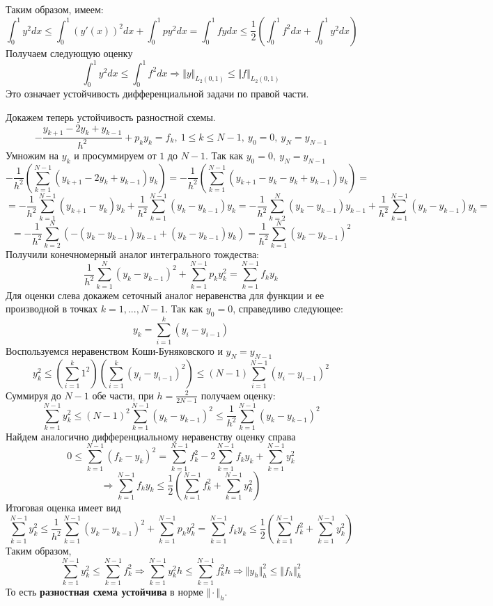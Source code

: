 Таким образом, имеем:
\[\int_0^1y^2dx\leq\int_0^1 (y'(x))^2dx+ \int_0^1py^2 dx = \int_0^1fydx\leq\frac{1}{2}\left(\int_0^1f^2dx + \int_0^1y^2dx\right)\]
Получаем следующую оценку
\[\int_0^1y^2dx\leq\int_0^1f^2dx\Rightarrow\Vert y\Vert_{L_2(0,1)}\leq\Vert f\Vert_{L_2(0,1)}\]
Это означает устойчивость дифференциальной задачи по правой части.

Докажем теперь устойчивость разностной схемы.
\[-\frac{y_{k+1}-2y_k+y_{k-1}}{h^2}+p_ky_k = f_k,\ 1 \leq k \leq N-1,\ y_0 = 0,\ y_N = y_{N-1}\]
Умножим на $y_k$ и просуммируем от $1$ до $N-1$. Так как $y_0 = 0,\ y_N = y_{N-1}$
\[-\frac{1}{h^2}\left(\sum_{k=1}^{N-1}\left(y_{k+1}-2y_k+y_{k-1}\right)y_k\right)=-\frac{1}{h^2}\left(\sum_{k=1}^{N-1}\left(y_{k+1}-y_k-y_k+y_{k-1}\right)y_k\right)=\]
\[=-\frac{1}{h^2}\sum_{k=1}^{N-1}\left(y_{k+1}-y_k\right)y_k+\frac{1}{h^2}\sum_{k=1}^{N-1}\left(y_k-y_{k-1}\right)y_k=-\frac{1}{h^2}\sum_{k=2}^{N}\left(y_{k}-y_{k-1}\right)y_{k-1}+\frac{1}{h^2}\sum_{k=1}^{N-1}\left(y_k-y_{k-1}\right)y_k=\]
\[=-\frac{1}{h^2}\sum_{k=2}^{N}\left(-\left(y_{k}-y_{k-1}\right)y_{k-1}+\left(y_k-y_{k-1}\right)y_k\right)=\frac{1}{h^2}\sum_{k=1}^{N}(y_k-y_{k-1})^2\]
Получили конечномерный аналог интегрального тождества:
\[\frac{1}{h^2}\sum_{k=1}^N(y_k-y_{k-1})^2+\sum_{k=1}^{N-1}p_ky_k^2=\sum_{k=1}^{N-1}f_ky_k\]
Для оценки слева докажем сеточный аналог неравенства для функции и ее производной в точках $k=1,...,N-1$.
Так как $y_0 = 0$, справедливо следующее:
\[y_k=\sum_{i=1}^{k}(y_i-y_{i-1})\]
Воспользуемся неравенством Коши-Буняковского и $y_N=y_{N-1}$
\[y_k^2\leq\left(\sum_{i=1}^k1^2\right)\left(\sum_{i=1}^k(y_i-y_{i-1})^2\right)\leq (N-1)\sum_{i=1}^{N-1}(y_i-y_{i-1})^2\]
Суммируя до $N-1$ обе части, при $h=\frac{2}{2N-1}$ получаем оценку:
\[\sum_{k=1}^{N-1}y_k^2\leq(N-1)^2\sum_{k=1}^{N-1}(y_k-y_{k-1})^2\leq\frac{1}{h^2}\sum_{k=1}^{N-1}(y_k-y_{k-1})^2\]
Найдем аналогично дифференциальному неравенству оценку справа
\[0\leq\sum_{k=1}^{N-1}(f_k-y_k)^2 = \sum_{k=1}^{N-1}f_k^2-2\sum_{k=1}^{N-1}f_ky_k+\sum_{k=1}^{N-1}y_k^2\]
\[\Rightarrow\sum_{k=1}^{N-1}f_ky_k\leq\frac{1}{2}\left(\sum_{k=1}^{N-1}f_k^2+\sum_{k=1}^{N-1}y_k^2\right)\]
Итоговая оценка имеет вид
\[\sum_{k=1}^{N-1}y_k^2\leq\frac{1}{h^2}\sum_{k=1}^{N-1}(y_k-y_{k-1})^2+\sum_{k=1}^{N-1}p_ky_k^2=\sum_{k=1}^{N-1}f_ky_k\leq\frac{1}{2}\left(\sum_{k=1}^{N-1}f_k^2+\sum_{k=1}^{N-1}y_k^2\right)\]
Таким образом,
\[\sum_{k=1}^{N-1}y_k^2\leq\sum_{k=1}^{N-1}f_k^2\Rightarrow\sum_{k=1}^{N-1}y_k^2h\leq\sum_{k=1}^{N-1}f_k^2h\Rightarrow\Vert y_h\Vert^2_h\leq\Vert f_h\Vert^2_h\]
То есть \textbf{разностная схема устойчива} в норме $\Vert\cdot\Vert_h$.

